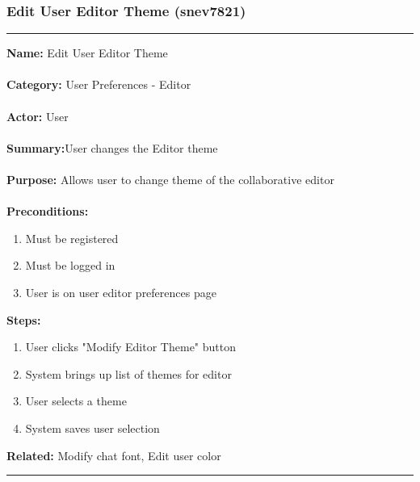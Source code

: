 \documentclass[11pt]{report}
\begin{document}
\subsubsection{Edit User Editor Theme (snev7821)}
\vspace{2pt}
\hrule
\vspace{8pt}
	\noindent\textbf{Name:} Edit User Editor Theme \\ \\
	\textbf{Category:} User Preferences - Editor  \\ \\
	\textbf{Actor:} User \\ \\
	\textbf{Summary:}User changes the Editor theme \\ \\
	\textbf{Purpose:} Allows user to change theme of the collaborative editor \\ \\
	\textbf{Preconditions:} 
	\begin{enumerate}
		\item Must be registered
		\item Must be logged in
		\item User is on user editor preferences page
	\end{enumerate}
	\textbf{Steps:}
	\begin{enumerate}
		\item User clicks "Modify Editor Theme" button
		\item System brings up list of themes for editor
		\item User selects a theme
		\item System saves user selection
	\end{enumerate}
	\textbf{Related:} Modify chat font, Edit user color 
\vspace{8pt}
\hrule

\newpage
\end{document}
